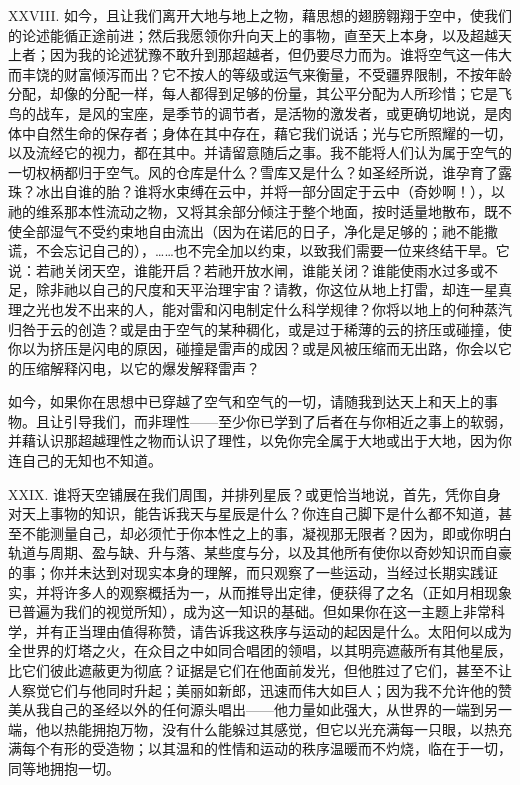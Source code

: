 XXVIII. 如今，且让我们离开大地与地上之物，藉思想的翅膀翱翔于空中，使我们的论述能循正途前进；然后我愿领你升向天上的事物，直至天上本身，以及超越天上者；因为我的论述犹豫不敢升到那超越者，但仍要尽力而为。谁将空气这一伟大而丰饶的财富倾泻而出？它不按人的等级或运气来衡量，不受疆界限制，不按年龄分配，却像的分配一样，每人都得到足够的份量，其公平分配为人所珍惜；它是飞鸟的战车，是风的宝座，是季节的调节者，是活物的激发者，或更确切地说，是肉体中自然生命的保存者；身体在其中存在，藉它我们说话；光与它所照耀的一切，以及流经它的视力，都在其中。并请留意随后之事。我不能将人们认为属于空气的一切权柄都归于空气。风的仓库是什么？雪库又是什么？如圣经所说，谁孕育了露珠？冰出自谁的胎？谁将水束缚在云中，并将一部分固定于云中（奇妙啊！），以祂的维系那本性流动之物，又将其余部分倾注于整个地面，按时适量地散布，既不使全部湿气不受约束地自由流出（因为在诺厄的日子，净化是足够的；祂不能撒谎，不会忘记自己的），……也不完全加以约束，以致我们需要一位来终结干旱。它说：若祂关闭天空，谁能开启？若祂开放水闸，谁能关闭？谁能使雨水过多或不足，除非祂以自己的尺度和天平治理宇宙？请教，你这位从地上打雷，却连一星真理之光也发不出来的人，能对雷和闪电制定什么科学规律？你将以地上的何种蒸汽归咎于云的创造？或是由于空气的某种稠化，或是过于稀薄的云的挤压或碰撞，使你以为挤压是闪电的原因，碰撞是雷声的成因？或是风被压缩而无出路，你会以它的压缩解释闪电，以它的爆发解释雷声？\par

如今，如果你在思想中已穿越了空气和空气的一切，请随我到达天上和天上的事物。且让引导我们，而非理性——至少你已学到了后者在与你相近之事上的软弱，并藉认识那超越理性之物而认识了理性，以免你完全属于大地或出于大地，因为你连自己的无知也不知道。\par

XXIX. 谁将天空铺展在我们周围，并排列星辰？或更恰当地说，首先，凭你自身对天上事物的知识，能告诉我天与星辰是什么？你连自己脚下是什么都不知道，甚至不能测量自己，却必须忙于你本性之上的事，凝视那无限者？因为，即或你明白轨道与周期、盈与缺、升与落、某些度与分，以及其他所有使你以奇妙知识而自豪的事；你并未达到对现实本身的理解，而只观察了一些运动，当经过长期实践证实，并将许多人的观察概括为一，从而推导出定律，便获得了之名（正如月相现象已普遍为我们的视觉所知），成为这一知识的基础。但如果你在这一主题上非常科学，并有正当理由值得称赞，请告诉我这秩序与运动的起因是什么。太阳何以成为全世界的灯塔之火，在众目之中如同合唱团的领唱，以其明亮遮蔽所有其他星辰，比它们彼此遮蔽更为彻底？证据是它们在他面前发光，但他胜过了它们，甚至不让人察觉它们与他同时升起；美丽如新郎，迅速而伟大如巨人；因为我不允许他的赞美从我自己的圣经以外的任何源头唱出——他力量如此强大，从世界的一端到另一端，他以热能拥抱万物，没有什么能躲过其感觉，但它以光充满每一只眼，以热充满每个有形的受造物；以其温和的性情和运动的秩序温暖而不灼烧，临在于一切，同等地拥抱一切。\par

